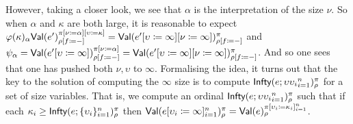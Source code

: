 However, taking a closer look, we see that $\alpha$ is the
interpretation of the size $\nu$.
%
So when $\alpha$ and $\kappa$ are both large, it is reasonable to
expect
$\varphi(\kappa)_\alpha
\textsf{Val}(e')_{\rho [f \coloneqq -]}^{\pi [\nu \coloneqq \alpha] [\upsilon \coloneqq \kappa]}
=
\textsf{Val}(e' [\upsilon \coloneqq \infty] [\nu \coloneqq \infty])_{\rho [f \coloneqq -]}^{\pi}$
and
$\psi_\alpha =
\textsf{Val}(e' [\upsilon \coloneqq \infty])_{\rho [f \coloneqq -]}^{\pi [\nu \coloneqq \alpha]}
=
\textsf{Val}(e' [\upsilon \coloneqq \infty] [\nu \coloneqq \infty])_{\rho [f \coloneqq -]}^{\pi}$.
%
And so one sees that one has pushed both $\nu,\upsilon$ to $\infty$.
%
Formalising the idea, it turns out that the key to the solution of
computing the $\infty$ size is to compute
$\textsf{Infty}(e;\upsilon{\upsilon_i}_{i=1}^n)_\rho^\pi$ for a set of size
variables.
%
That is, we compute an ordinal
$\textsf{Infty}(e;\upsilon{\upsilon_i}_{i=1}^n)_\rho^\pi$ such that
if each $\kappa_i \geq \textsf{Infty}(e;\{\upsilon_i\}_{i=1}^n)_\rho^\pi$
then
$\textsf{Val}(e [\upsilon_i \coloneqq \infty]_{i=1}^n)_\rho^\pi
=
\textsf{Val}(e)_\rho^{\pi [\upsilon_i \coloneqq \kappa_i]_{i=1}^n}$.
\fi

